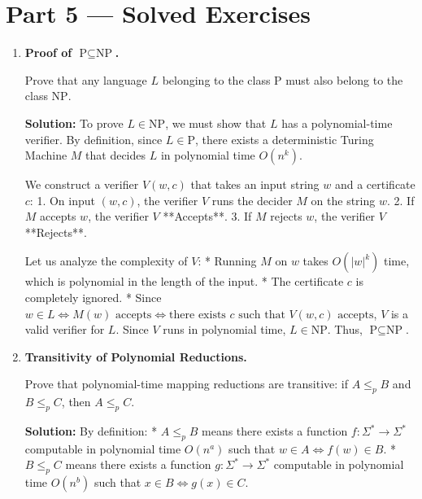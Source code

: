 \documentclass[12pt, a4paper]{book}
\begin{document}
\section{Part 5 --- Solved Exercises}

\begin{problembox}
\begin{enumerate}[label=\textbf{E\arabic*.}]
  \item \textbf{Proof of $\text{P} \subseteq \text{NP}$.}
  
        Prove that any language $L$ belonging to the class $\text{P}$ must also belong to the class $\text{NP}$.
        
        \textbf{Solution:}
        To prove $L \in \text{NP}$, we must show that $L$ has a polynomial-time verifier.
        By definition, since $L \in \text{P}$, there exists a deterministic Turing Machine $M$ that decides $L$ in polynomial time $O(n^k)$.
        
        We construct a verifier $V(w, c)$ that takes an input string $w$ and a certificate $c$:
        1. On input $(w, c)$, the verifier $V$ runs the decider $M$ on the string $w$.
        2. If $M$ accepts $w$, the verifier $V$ **Accepts**.
        3. If $M$ rejects $w$, the verifier $V$ **Rejects**.
        
        Let us analyze the complexity of $V$:
        * Running $M$ on $w$ takes $O(|w|^k)$ time, which is polynomial in the length of the input.
        * The certificate $c$ is completely ignored.
        * Since $w \in L \iff M(w) \text{ accepts} \iff \text{there exists } c \text{ such that } V(w, c) \text{ accepts}$, $V$ is a valid verifier for $L$.
        Since $V$ runs in polynomial time, $L \in \text{NP}$.
        Thus, $\text{P} \subseteq \text{NP}$.
        
  \item \textbf{Transitivity of Polynomial Reductions.}
  
        Prove that polynomial-time mapping reductions are transitive: if $A \le_p B$ and $B \le_p C$, then $A \le_p C$.
        
        \textbf{Solution:}
        By definition:
        * $A \le_p B$ means there exists a function $f: \Sigma^* \to \Sigma^*$ computable in polynomial time $O(n^a)$ such that $w \in A \iff f(w) \in B$.
        * $B \le_p C$ means there exists a function $g: \Sigma^* \to \Sigma^*$ computable in polynomial time $O(n^b)$ such that $x \in B \iff g(x) \in C$.
        

\end{enumerate}
\end{problembox}
\end{document}

